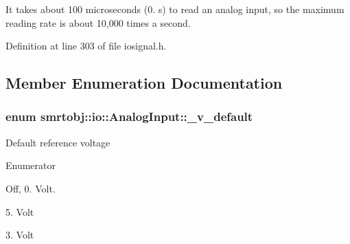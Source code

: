 It takes about 100 microseconds (0. s) to read an analog input, so the maximum reading rate is about 10,000 times a second. 

Definition at line 303 of file iosignal.\+h.



\subsection{Member Enumeration Documentation}
\hypertarget{classsmrtobj_1_1io_1_1_analog_input_a4e2bf85b374d5856fc0dee0225fbd025}{}
\subsubsection[{\+\_\+v\+\_\+default}]{\setlength{\rightskip}{0pt plus 5cm}enum {\bf smrtobj\+::io\+::\+Analog\+Input\+::\+\_\+v\+\_\+default}}\label{classsmrtobj_1_1io_1_1_analog_input_a4e2bf85b374d5856fc0dee0225fbd025}
Default reference voltage \begin{Desc}
\item[Enumerator]\par
\begin{description}
\item[{\em 
\hypertarget{classsmrtobj_1_1io_1_1_analog_input_a4e2bf85b374d5856fc0dee0225fbd025a61b0cbe28d17a05cb3a268398c370cb9}{}V0\+\_\+0\label{classsmrtobj_1_1io_1_1_analog_input_a4e2bf85b374d5856fc0dee0225fbd025a61b0cbe28d17a05cb3a268398c370cb9}
}]Off, 0. Volt. \item[{\em 
\hypertarget{classsmrtobj_1_1io_1_1_analog_input_a4e2bf85b374d5856fc0dee0225fbd025a2692641238f0ae5eb558d1f9c1688604}{}V5\+\_\+0\label{classsmrtobj_1_1io_1_1_analog_input_a4e2bf85b374d5856fc0dee0225fbd025a2692641238f0ae5eb558d1f9c1688604}
}]5. Volt \item[{\em 
\hypertarget{classsmrtobj_1_1io_1_1_analog_input_a4e2bf85b374d5856fc0dee0225fbd025aac4c61fd6d37aacbf3bd6a3be6d835d3}{}V3\+\_\+3\label{classsmrtobj_1_1io_1_1_analog_input_a4e2bf85b374d5856fc0dee0225fbd025aac4c61fd6d37aacbf3bd6a3be6d835d3}
}]3. Volt \end{description}
\end{Desc}


